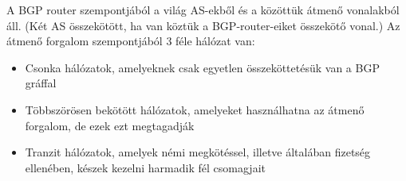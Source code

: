 \documentclass[margin=0px]{article}
\begin{document}
\begin{description}
\begin{itemize}
					A BGP router szempontjából a világ AS-ekből és a közöttük átmenő vonalakból áll. (Két AS összekötött, ha van köztük a BGP-router-eiket összekötő vonal.)
					Az átmenő forgalom szempontjából 3 féle hálózat van:
					\begin{itemize}
						\item Csonka hálózatok, amelyeknek csak egyetlen összeköttetésük van a BGP gráffal
						\item Többszörösen bekötött hálózatok, amelyeket használhatna az átmenő forgalom, de ezek ezt megtagadják
						\item Tranzit hálózatok, amelyek némi megkötéssel, illetve általában fizetség ellenében, készek kezelni harmadik fél csomagjait
					\end{itemize}
			\end{itemize}
		\end{description}
\end{document}
